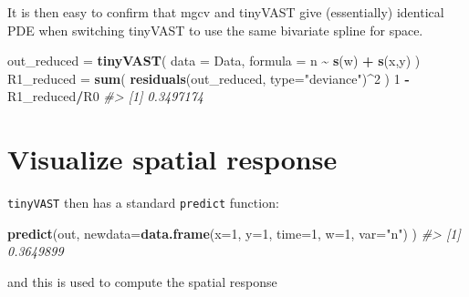 \documentclass[
]{article}
\newenvironment{Shaded}{\begin{snugshade}}{\end{snugshade}}
\newcommand{\AttributeTok}[1]{\textcolor[rgb]{0.13,0.29,0.53}{#1}}
\newcommand{\CommentTok}[1]{\textcolor[rgb]{0.56,0.35,0.01}{\textit{#1}}}
\newcommand{\DecValTok}[1]{\textcolor[rgb]{0.00,0.00,0.81}{#1}}
\newcommand{\FunctionTok}[1]{\textcolor[rgb]{0.13,0.29,0.53}{\textbf{#1}}}
\newcommand{\NormalTok}[1]{#1}
\newcommand{\OtherTok}[1]{\textcolor[rgb]{0.56,0.35,0.01}{#1}}
\newcommand{\SpecialCharTok}[1]{\textcolor[rgb]{0.81,0.36,0.00}{\textbf{#1}}}
\newcommand{\StringTok}[1]{\textcolor[rgb]{0.31,0.60,0.02}{#1}}
\begin{document}
It is then easy to confirm that mgcv and tinyVAST give (essentially)
identical PDE when switching tinyVAST to use the same bivariate spline
for space.

\begin{Shaded}
\begin{Highlighting}[]
\NormalTok{out\_reduced }\OtherTok{=} \FunctionTok{tinyVAST}\NormalTok{( }\AttributeTok{data =}\NormalTok{ Data,}
                        \AttributeTok{formula =}\NormalTok{ n }\SpecialCharTok{\textasciitilde{}} \FunctionTok{s}\NormalTok{(w) }\SpecialCharTok{+} \FunctionTok{s}\NormalTok{(x,y) )}
\NormalTok{R1\_reduced }\OtherTok{=} \FunctionTok{sum}\NormalTok{( }\FunctionTok{residuals}\NormalTok{(out\_reduced, }\AttributeTok{type=}\StringTok{"deviance"}\NormalTok{)}\SpecialCharTok{\^{}}\DecValTok{2}\NormalTok{ )}
\DecValTok{1} \SpecialCharTok{{-}}\NormalTok{ R1\_reduced}\SpecialCharTok{/}\NormalTok{R0}
\CommentTok{\#\textgreater{} [1] 0.3497174}
\end{Highlighting}
\end{Shaded}

\section{Visualize spatial response}\label{visualize-spatial-response}

\texttt{tinyVAST} then has a standard \texttt{predict} function:

\begin{Shaded}
\begin{Highlighting}[]
\FunctionTok{predict}\NormalTok{(out, }\AttributeTok{newdata=}\FunctionTok{data.frame}\NormalTok{(}\AttributeTok{x=}\DecValTok{1}\NormalTok{, }\AttributeTok{y=}\DecValTok{1}\NormalTok{, }\AttributeTok{time=}\DecValTok{1}\NormalTok{, }\AttributeTok{w=}\DecValTok{1}\NormalTok{, }\AttributeTok{var=}\StringTok{"n"}\NormalTok{) )}
\CommentTok{\#\textgreater{} [1] 0.3649899}
\end{Highlighting}
\end{Shaded}

and this is used to compute the spatial response
\end{document}
